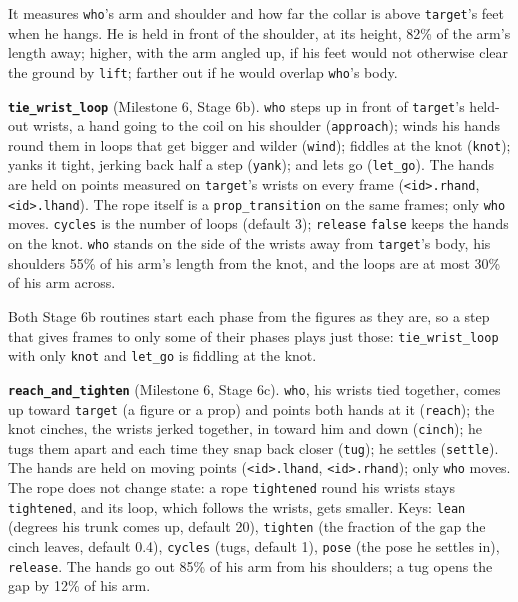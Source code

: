 \documentclass[
  12pt,
  letterpaper,
]{book}
\begin{document}
It measures \texttt{who}'s arm and shoulder and how far the collar is
above \texttt{target}'s feet when he hangs. He is held in front of the
shoulder, at its height, 82\% of the arm's length away; higher, with
the arm angled up, if his feet would not otherwise clear the ground by
\texttt{lift}; farther out if he would overlap \texttt{who}'s body.

\textbf{\texttt{tie\_wrist\_loop}} (Milestone 6, Stage 6b). \texttt{who}
steps up in front of \texttt{target}'s held-out wrists, a hand going to
the coil on his shoulder (\texttt{approach}); winds his hands round them
in loops that get bigger and wilder (\texttt{wind}); fiddles at the knot
(\texttt{knot}); yanks it tight, jerking back half a step
(\texttt{yank}); and lets go (\texttt{let\_go}). The hands are held on
points measured on \texttt{target}'s wrists on every frame
(\texttt{<id>.rhand}, \texttt{<id>.lhand}). The rope itself is a
\texttt{prop\_transition} on the same frames; only \texttt{who} moves.
\texttt{cycles} is the number of loops (default 3); \texttt{release}
\texttt{false} keeps the hands on the knot. \texttt{who} stands on the
side of the wrists away from \texttt{target}'s body, his shoulders 55\%
of his arm's length from the knot, and the loops are at most 30\% of
his arm across.

Both Stage 6b routines start each phase from the figures as they are,
so a step that gives frames to only some of their phases plays just
those: \texttt{tie\_wrist\_loop} with only \texttt{knot} and
\texttt{let\_go} is fiddling at the knot.

\textbf{\texttt{reach\_and\_tighten}} (Milestone 6, Stage 6c).
\texttt{who}, his wrists tied together, comes up toward \texttt{target}
(a figure or a prop) and points both hands at it (\texttt{reach}); the
knot cinches, the wrists jerked together, in toward him and down
(\texttt{cinch}); he tugs them apart and each time they snap back closer
(\texttt{tug}); he settles (\texttt{settle}). The hands are held on
moving points (\texttt{<id>.lhand}, \texttt{<id>.rhand}); only
\texttt{who} moves. The rope does not change state: a rope
\texttt{tightened} round his wrists stays \texttt{tightened}, and its
loop, which follows the wrists, gets smaller. Keys: \texttt{lean}
(degrees his trunk comes up, default 20), \texttt{tighten} (the
fraction of the gap the cinch leaves, default 0.4), \texttt{cycles}
(tugs, default 1), \texttt{pose} (the pose he settles in),
\texttt{release}. The hands go out 85\% of his arm from his shoulders;
a tug opens the gap by 12\% of his arm.
\end{document}

